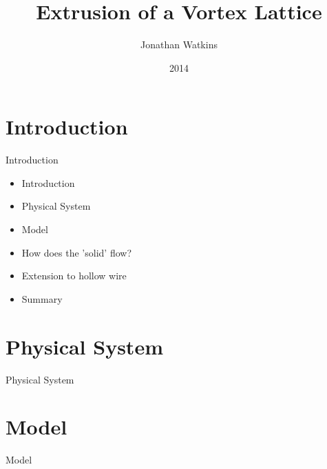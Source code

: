 \documentclass{beamer}
\title[ext talk]{Extrusion of a Vortex Lattice}
\author{Jonathan Watkins}
\institute{University of Birmingham}
\date{2014}
\begin{document}
\begin{frame}
  \titlepage
\end{frame}


\section{Introduction}

\begin{frame}{Introduction}

\begin{itemize}
  \item Introduction
  \item Physical System
  \item Model
  \item How does the 'solid' flow?
  \item Extension to hollow wire
  \item Summary
\end{itemize}


\end{frame}

\section{Physical System}

\begin{frame}{Physical System}


\end{frame}

\section{Model}

\begin{frame}{Model}


\end{frame}
\end{document}

